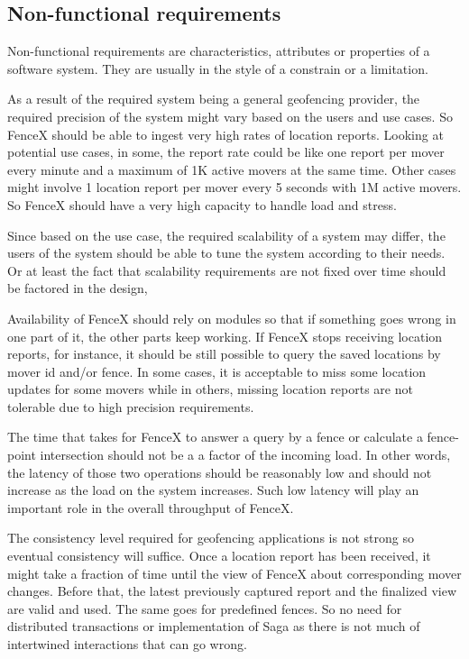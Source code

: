 \documentclass[a4]{report}
\begin{document}
    \subsection{Non-functional requirements}
    Non-functional requirements are characteristics, attributes or properties of a software system.
    They are usually in the style of a constrain or a limitation.

    As a result of the required system being a general geofencing provider, the required precision of the system might vary
    based on the users and use cases.
    So FenceX should be able to ingest very high rates of location reports.
    Looking at potential use cases, in some, the report rate could be like one report per mover every minute and a maximum of 1K active movers at the same time.
    Other cases might involve 1 location report per mover every 5 seconds with 1M active movers.
    So FenceX should have a very high capacity to handle load and stress.

    Since based on the use case, the required scalability of a system may differ, the users of the system should be able to
    tune the system according to their needs.
    Or at least the fact that scalability requirements are not fixed over time should be factored in the design,

    Availability of FenceX should rely on modules so that if something goes wrong in one part of it, the other parts
    keep working.
    If FenceX stops receiving location reports, for instance, it should be still possible to query the saved
    locations by mover id and/or fence.
    In some cases, it is acceptable to miss some location updates for some movers while in others, missing location
    reports are not tolerable due to high precision requirements.

    The time that takes for FenceX to answer a query by a fence or calculate a fence-point intersection should not be a
    a factor of the incoming load.
    In other words, the latency of those two operations should be reasonably low and should not increase as the load
    on the system increases.
    Such low latency will play an important role in the overall throughput of FenceX.

    The consistency level required for geofencing applications is not strong so eventual consistency will suffice.
    Once a location report has been received, it might take a fraction of time until the view of FenceX about corresponding mover changes.
    Before that, the latest previously captured report and the finalized view are valid and used.
    The same goes for predefined fences.
    So no need for distributed transactions or implementation of Saga as there is not much of intertwined
    interactions that can go wrong.
\end{document}

